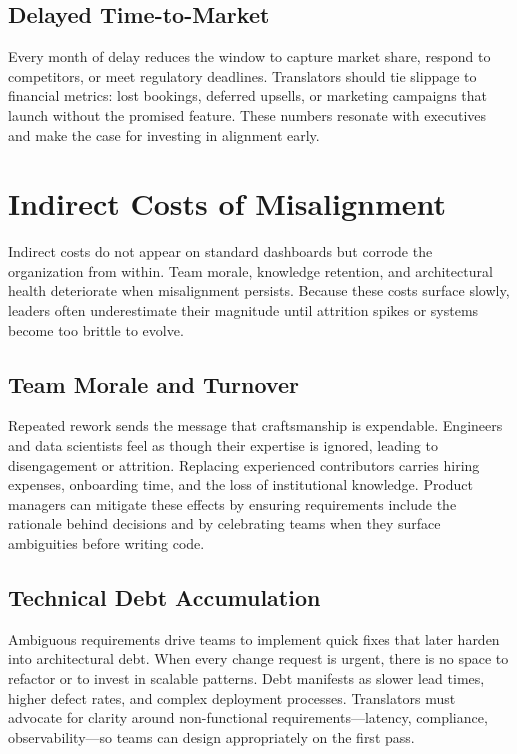 \subsection{Delayed Time-to-Market}
Every month of delay reduces the window to capture market share, respond to competitors, or meet regulatory deadlines. Translators should tie slippage to financial metrics: lost bookings, deferred upsells, or marketing campaigns that launch without the promised feature. These numbers resonate with executives and make the case for investing in alignment early.

\section{Indirect Costs of Misalignment}
\label{sec:indirect-costs}

Indirect costs do not appear on standard dashboards but corrode the organization from within. Team morale, knowledge retention, and architectural health deteriorate when misalignment persists. Because these costs surface slowly, leaders often underestimate their magnitude until attrition spikes or systems become too brittle to evolve.

\subsection{Team Morale and Turnover}
Repeated rework sends the message that craftsmanship is expendable. Engineers and data scientists feel as though their expertise is ignored, leading to disengagement or attrition. Replacing experienced contributors carries hiring expenses, onboarding time, and the loss of institutional knowledge. Product managers can mitigate these effects by ensuring requirements include the rationale behind decisions and by celebrating teams when they surface ambiguities before writing code.

\subsection{Technical Debt Accumulation}
Ambiguous requirements drive teams to implement quick fixes that later harden into architectural debt. When every change request is urgent, there is no space to refactor or to invest in scalable patterns. Debt manifests as slower lead times, higher defect rates, and complex deployment processes. Translators must advocate for clarity around non-functional requirements---latency, compliance, observability---so teams can design appropriately on the first pass.


